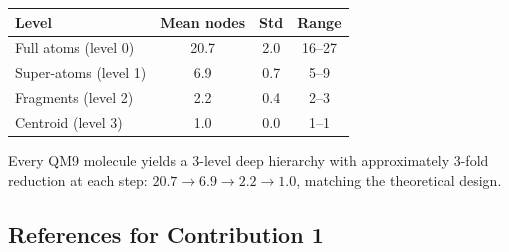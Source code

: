 \documentclass[12pt,a4paper]{article}
\begin{document}
\begin{center}
\begin{tabular}{lccc}
\toprule
\textbf{Level} & \textbf{Mean nodes} & \textbf{Std} & \textbf{Range} \\
\midrule
Full atoms (level 0) & 20.7 & 2.0 & 16--27 \\
Super-atoms (level 1) & 6.9 & 0.7 & 5--9 \\
Fragments (level 2) & 2.2 & 0.4 & 2--3 \\
Centroid (level 3) & 1.0 & 0.0 & 1--1 \\
\bottomrule
\end{tabular}
\end{center}

Every QM9 molecule yields a 3-level deep hierarchy with approximately 3-fold reduction at each step: $20.7 \to 6.9 \to 2.2 \to 1.0$, matching the theoretical design.

\subsection{References for Contribution 1}
\end{document}
